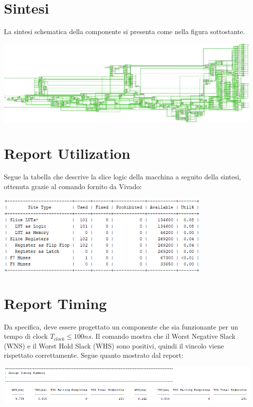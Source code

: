\section{Sintesi}
La sintesi schematica della componente si presenta come nella figura sottostante.

\begin{center}
\includegraphics[width=\textwidth]{images/Schematic.png}
\end{center}

\section{Report Utilization}
Segue la tabella che descrive la slice logic della macchina a seguito della sintesi, ottenuta grazie al comando  fornito da Vivado:

\begin{center}
\includegraphics[width=0.8\textwidth]{images/report_uilization.png}
\end{center}

\section{Report Timing}
Da specifica, deve essere progettato un componente che sia funzionante per un tempo di clock $T_{clock}\leq 100 ns$. Il comando  mostra che il Worst Negative Slack (WNS) e il Worst Hold Slack (WHS) sono positivi, quindi il vincolo viene rispettato correttamente. Segue quanto mostrato dal report:

\begin{center}
\includegraphics[width=\textwidth]{images/report_timing.png}
\end{center}

